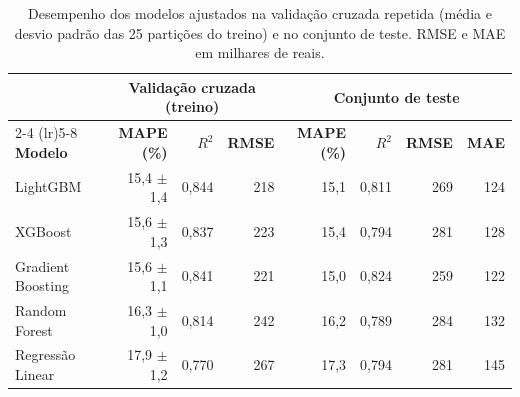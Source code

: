 \begin{table}[ht]
\centering
\caption{Desempenho dos modelos ajustados na validação cruzada repetida (média e desvio padrão das 25 partições do treino) e no conjunto de teste. RMSE e MAE em milhares de reais.}
\label{tab:resultados}
\begin{tabular}{lrrrrrrr}
\toprule
& \multicolumn{3}{c}{\textbf{Validação cruzada (treino)}} & \multicolumn{4}{c}{\textbf{Conjunto de teste}} \\
\cmidrule(lr){2-4} \cmidrule(lr){5-8}
\textbf{Modelo} & \textbf{MAPE (\%)} & \textbf{$R^2$} & \textbf{RMSE} & \textbf{MAPE (\%)} & \textbf{$R^2$} & \textbf{RMSE} & \textbf{MAE} \\
\midrule
LightGBM & 15,4 $\pm$ 1,4 & 0,844 & 218 & 15,1 & 0,811 & 269 & 124 \\
XGBoost & 15,6 $\pm$ 1,3 & 0,837 & 223 & 15,4 & 0,794 & 281 & 128 \\
Gradient Boosting & 15,6 $\pm$ 1,1 & 0,841 & 221 & 15,0 & 0,824 & 259 & 122 \\
Random Forest & 16,3 $\pm$ 1,0 & 0,814 & 242 & 16,2 & 0,789 & 284 & 132 \\
Regressão Linear & 17,9 $\pm$ 1,2 & 0,770 & 267 & 17,3 & 0,794 & 281 & 145 \\
\bottomrule
\end{tabular}
\end{table}
